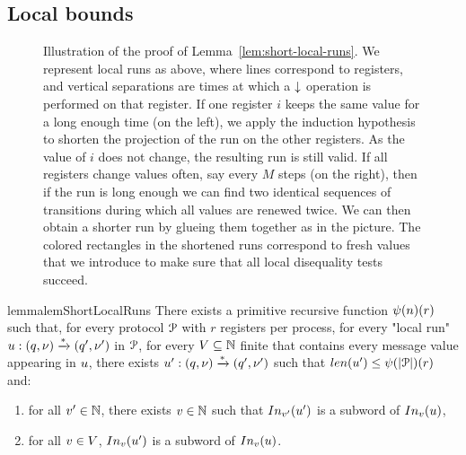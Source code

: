 \subsection{Local bounds}
\label{sec:local-bounds}


\begin{figure}
	
	\caption{Illustration of the proof of Lemma~\ref{lem:short-local-runs}. We represent local runs as above, where lines correspond to registers, and vertical separations are times at which a $\downarrow$ operation is performed on that register. If one register $i$ keeps the same value for a long enough time (on the left), we apply the induction hypothesis to shorten the projection of the run on the other registers. As the value of $i$ does not change, the resulting run is still valid. If all registers change values often, say every $M$ steps (on the right), then if the run is long enough we can find two identical sequences of transitions during which all values are renewed twice. We can then obtain a shorter run by glueing them together as in the picture. The colored rectangles in the shortened runs correspond to fresh values that we introduce to make sure that all local disequality tests succeed.}
\end{figure}
\begin{restatable}{lemma}{lemShortLocalRuns}
	\label{lem:short-local-runs}
	There exists a primitive recursive function $\psi(n) (r)$ such that, for every protocol $\mathcal{P}$ with $r$ registers per process, for every "local run" $u: (q, \nu) \xrightarrow{*} (q', \nu')$ in $\mathcal{P}$, for every $V \subseteq \mathbb{N}$ finite that contains every message value appearing in $u$, there exists $u': (q, \nu) \xrightarrow{*} (q', \nu')$ such that $\length{\localrun'} \leq \towerfun(\size{\prot})(r)$ and:
	\begin{enumerate}
		\item \label{item:shorterrun_anyvalue} for all $v' \in \mathbb{N}$, there exists $v \in \mathbb{N}$ such that $\vinput{\aval'}{\localrun'}$ is a subword of $\vinput{\aval}{\localrun}$,
		\item \label{item:shorterrun_oldvalues} for all $v \in V$, $\vinput{\aval}{\localrun'}$ is a subword of $\vinput{\aval}{\localrun}$. 
	\end{enumerate}
\end{restatable}

